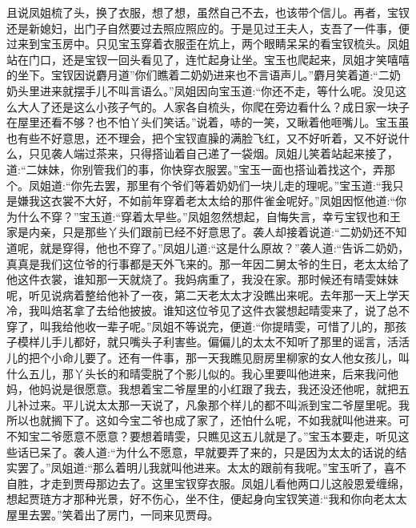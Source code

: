 \begin{parag}
    且说凤姐梳了头，换了衣服，想了想，虽然自己不去，也该带个信儿。再者，宝钗还是新媳妇，出门子自然要过去照应照应的。于是见过王夫人，支吾了一件事，便过来到宝玉房中。只见宝玉穿着衣服歪在炕上，两个眼睛呆呆的看宝钗梳头。凤姐站在门口，还是宝钗一回头看见了，连忙起身让坐。宝玉也爬起来，凤姐才笑嘻嘻的坐下。宝钗因说麝月道”你们瞧着二奶奶进来也不言语声儿。”麝月笑着道:“二奶奶头里进来就摆手儿不叫言语么。”凤姐因向宝玉道:“你还不走，等什么呢。没见这么大人了还是这么小孩子气的。人家各自梳头，你爬在旁边看什么？成日家一块子在屋里还看不够？也不怕丫头们笑话。”说着，哧的一笑，又瞅着他咂嘴儿。宝玉虽也有些不好意思，还不理会，把个宝钗直臊的满脸飞红，又不好听着，又不好说什么，只见袭人端过茶来，只得搭讪着自己递了一袋烟。凤姐儿笑着站起来接了，道:“二妹妹，你别管我们的事，你快穿衣服罢。”宝玉一面也搭讪着找这个，弄那个。凤姐道:“你先去罢，那里有个爷们等着奶奶们一块儿走的理呢。”宝玉道:“我只是嫌我这衣裳不大好，不如前年穿着老太太给的那件雀金呢好。”凤姐因怄他道:“你为什么不穿？”宝玉道:“穿着太早些。”凤姐忽然想起，自悔失言，幸亏宝钗也和王家是内亲，只是那些丫头们跟前已经不好意思了。袭人却接着说道:“二奶奶还不知道呢，就是穿得，他也不穿了。”凤姐儿道:“这是什么原故？”袭人道:“告诉二奶奶，真真是我们这位爷的行事都是天外飞来的。那一年因二舅太爷的生日，老太太给了他这件衣裳，谁知那一天就烧了。我妈病重了，我没在家。那时候还有晴雯妹妹呢，听见说病着整给他补了一夜，第二天老太太才没瞧出来呢。去年那一天上学天冷，我叫焙茗拿了去给他披披。谁知这位爷见了这件衣裳想起晴雯来了，说了总不穿了，叫我给他收一辈子呢。”凤姐不等说完，便道:“你提晴雯，可惜了儿的，那孩子模样儿手儿都好，就只嘴头子利害些。偏偏儿的太太不知听了那里的谣言，活活儿的把个小命儿要了。还有一件事，那一天我瞧见厨房里柳家的女人他女孩儿，叫什么五儿，那丫头长的和晴雯脱了个影儿似的。我心里要叫他进来，后来我问他妈，他妈说是很愿意。我想着宝二爷屋里的小红跟了我去，我还没还他呢，就把五儿补过来。平儿说太太那一天说了，凡象那个样儿的都不叫派到宝二爷屋里呢。我所以也就搁下了。这如今宝二爷也成了家了，还怕什么呢，不如我就叫他进来。可不知宝二爷愿意不愿意？要想着晴雯，只瞧见这五儿就是了。”宝玉本要走，听见这些话已呆了。袭人道:“为什么不愿意，早就要弄了来的，只是因为太太的话说的结实罢了。”凤姐道:“那么着明儿我就叫他进来。太太的跟前有我呢。”宝玉听了，喜不自胜，才走到贾母那边去了。这里宝钗穿衣服。凤姐儿看他两口儿这般恩爱缠绵，想起贾琏方才那种光景，好不伤心，坐不住，便起身向宝钗笑道:“我和你向老太太屋里去罢。”笑着出了房门，一同来见贾母。
\end{parag}



